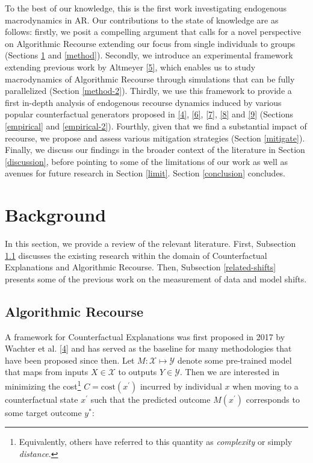 \documentclass[conference,final,]{IEEEtran}
\theoremstyle{definition}
\theoremstyle{definition}
\theoremstyle{definition}
\theoremstyle{definition}
\theoremstyle{remark}
\begin{document}
To the best of our knowledge, this is the first work investigating endogenous macrodynamics in AR. Our contributions to the state of knowledge are as follows: firstly, we posit a compelling argument that calls for a novel perspective on Algorithmic Recourse extending our focus from single individuals to groups (Sections \ref{related} and \ref{method}). Secondly, we introduce an experimental framework extending previous work by Altmeyer \protect\hyperlink{ref-altmeyer2022counterfactualexplanations}{{[}5{]}}, which enables us to study macrodynamics of Algorithmic Recourse through simulations that can be fully parallelized (Section \ref{method-2}). Thirdly, we use this framework to provide a first in-depth analysis of endogenous recourse dynamics induced by various popular counterfactual generators proposed in \protect\hyperlink{ref-wachter2017counterfactual}{{[}4{]}}, \protect\hyperlink{ref-schut2021generating}{{[}6{]}}, \protect\hyperlink{ref-joshi2019realistic}{{[}7{]}}, \protect\hyperlink{ref-mothilal2020explaining}{{[}8{]}} and \protect\hyperlink{ref-antoran2020getting}{{[}9{]}} (Sections \ref{empirical} and \ref{empirical-2}). Fourthly, given that we find a substantial impact of recourse, we propose and assess various mitigation strategies (Section \ref{mitigate}). Finally, we discuss our findings in the broader context of the literature in Section \ref{discussion}, before pointing to some of the limitations of our work as well as avenues for future research in Section \ref{limit}. Section \ref{conclusion} concludes.

\hypertarget{related}{%
\section{Background}\label{related}}

In this section, we provide a review of the relevant literature. First, Subsection \ref{related-recourse} discusses the existing research within the domain of Counterfactual Explanations and Algorithmic Recourse. Then, Subsection \ref{related-shifts} presents some of the previous work on the measurement of data and model shifts.

\hypertarget{related-recourse}{%
\subsection{Algorithmic Recourse}\label{related-recourse}}

A framework for Counterfactual Explanations was first proposed in 2017 by Wachter et al. \protect\hyperlink{ref-wachter2017counterfactual}{{[}4{]}} and has served as the baseline for many methodologies that have been proposed since then. Let \(M: \mathcal{X} \mapsto \mathcal{Y}\) denote some pre-trained model that maps from inputs \(X \in \mathcal{X}\) to outputs \(Y \in \mathcal{Y}\). Then we are interested in minimizing the cost\footnote{Equivalently, others have referred to this quantity as \emph{complexity} or simply \emph{distance}.} \(C=\text{cost}(x^\prime)\) incurred by individual \(x\) when moving to a counterfactual state \(x^\prime\) such that the predicted outcome \(M(x^\prime)\) corresponds to some target outcome \(y^*\):
\end{document}
